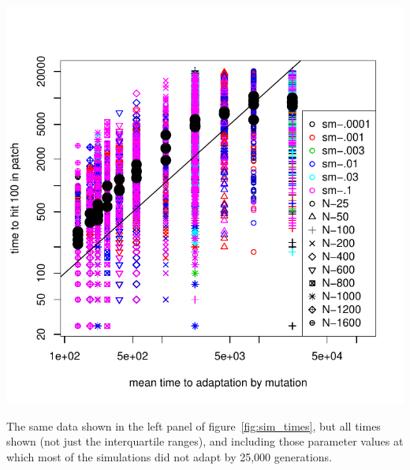 \documentclass{article}
\begin{document}





\begin{sfigure}
  \begin{center}
    \includegraphics{mutation-times-predicted}
  \end{center}
  \caption{
    The same data shown in the left panel of figure~\ref{fig:sim_times},
    but all times shown (not just the interquartile ranges),
    and including those parameter values at which most of the simulations did not adapt by 25,000 generations.
  } \label{sfig:sim_migration_times}
\end{sfigure}
\end{document}
